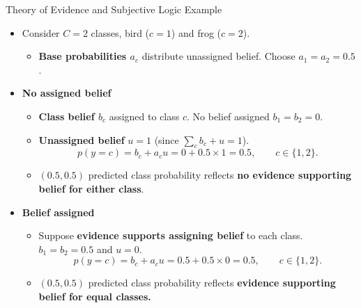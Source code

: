     \begin{frame}{Theory of Evidence and Subjective Logic Example}
    \label{frm:backup-belief-example}
    \setlength{\abovedisplayskip}{4pt}
    \setlength{\belowdisplayskip}{4pt}
    \begin{itemize}
    \setlength{\itemsep}{3mm}
    \item Consider $C=2$ classes, bird ($c=1$) and frog ($c=2$).
    \begin{itemize}
    \item \textbf{Base probabilities $a_c$} distribute unassigned belief. Choose $a_1=a_2=0.5$.
    \end{itemize}
    \item \textbf{No assigned belief}
    \begin{itemize}
    \item \textbf{Class belief $b_c$} assigned to class $c$.
    No belief assigned $b_1=b_2=0$.
    \item \textbf{Unassigned belief} $u=1$ (since $\sum_c b_c+u=1$).
    \[
    p(y=c)=b_c+a_cu=0+0.5\times1=0.5,
    \qquad c\in\{1,2\}.
    \]
    \item $(0.5,0.5)$ predicted class probability reflects \textbf{no evidence supporting belief for either class}.
    \end{itemize}
    \item \textbf{Belief assigned}
    \begin{itemize}
    \item Suppose \textbf{evidence supports assigning belief} to each class. $b_1=b_2=0.5$ and $u=0$.
    \[
    p(y=c)=b_c+a_cu=0.5+0.5\times0=0.5,
    \qquad c\in\{1,2\}.
    \]
    \item $(0.5,0.5)$ predicted class probability reflects \textbf{evidence supporting belief for equal classes.}
    \end{itemize}
    \end{itemize}
    \end{frame}
    
